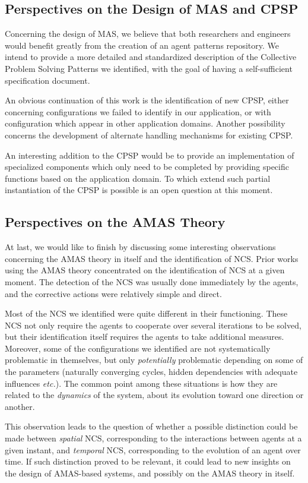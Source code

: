 \subsection*{Perspectives on the Design of MAS and CPSP}

Concerning the design of MAS, we believe that both researchers and engineers would benefit greatly from the creation of an agent patterns repository. We intend to provide a more detailed and standardized description of the Collective Problem Solving Patterns we identified, with the goal of having a self-sufficient specification document.

An obvious continuation of this work is the identification of new CPSP, either concerning configurations we failed to identify in our application, or with configuration which appear in other application domains. Another possibility concerns the development of alternate handling mechanisms for existing CPSP.

An interesting addition to the CPSP would be to provide an implementation of specialized components which only need to be completed by providing specific functions based on the application domain. To which extend such partial instantiation of the CPSP is possible is an open question at this moment.

\subsection*{Perspectives on the AMAS Theory}

At last, we would like to finish by discussing some interesting observations concerning the AMAS theory in itself and the identification of NCS. Prior works using the AMAS theory concentrated on the identification of NCS at a given moment. The detection of the NCS was usually done immediately by the agents, and the corrective actions were relatively simple and direct.

Most of the NCS we identified were quite different in their functioning. These NCS not only require the agents to cooperate over several iterations to be solved, but their identification itself requires the agents to take additional measures. Moreover, some of the configurations we identified are not systematically problematic in themselves, but only \emph{potentially} problematic depending on some of the parameters (naturally converging cycles, hidden dependencies with adequate influences \emph{etc.}). The common point among these situations is how they are related to the \emph{dynamics} of the system, about its evolution toward one direction or another.

This observation leads to the question of whether a possible distinction could be made between \emph{spatial} NCS, corresponding to the interactions between agents at a given instant, and \emph{temporal} NCS, corresponding to the evolution of an agent over time. If such distinction proved to be relevant, it could lead to new insights on the design of AMAS-based systems, and possibly on the AMAS theory in itself.

